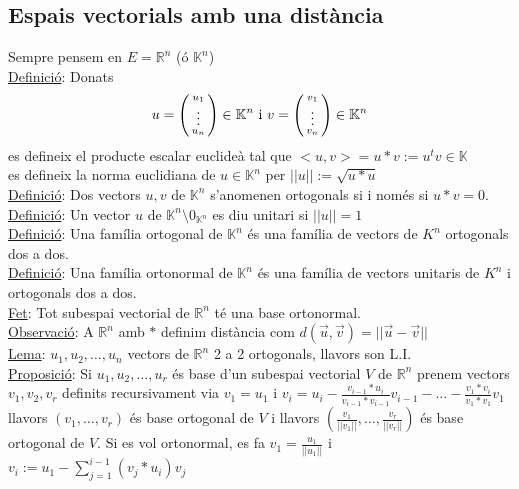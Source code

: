 \documentclass[../main.tex]{subfiles}
\begin{document}
    \subsection{Espais vectorials amb una distància}
    Sempre pensem en $E = \mathbb{R}^n$ (ó $\mathbb{K}^n$)\\
    \underline{Definició}: Donats 
    \begin{displaymath}
        u=\begin{psmallmatrix} u_1 \\ \vdots \\ u_n \end{psmallmatrix} \in \mathbb{K}^n \text{ i }v=\begin{psmallmatrix} v_1 \\ \vdots \\ v_n \end{psmallmatrix} \in \mathbb{K}^n
    \end{displaymath}
    es defineix el producte escalar euclideà tal que $<u, v> = u * v := u^tv \in \mathbb{K}$\\
    es defineix la norma euclidiana de $u \in \mathbb{K}^n$ per $||u|| := \sqrt{u*u}$\\
    \underline{Definició}: Dos vectors $u, v$ de $\mathbb{K}^n$ s'anomenen ortogonals si i només si $u*v=0$.\\
    \underline{Definició}: Un vector $u$ de $\mathbb{K}^n \setminus 0_{\mathbb{K}^n}$ es diu unitari si $||u|| = 1$\\
    \underline{Definició}: Una família ortogonal de $\mathbb{K}^n$ és una família de vectors de $K^n$ ortogonals dos a dos.\\
    \underline{Definició}: Una família ortonormal de $\mathbb{K}^n$ és una família de vectors unitaris de $K^n$ i ortogonals dos a dos.\\
    \underline{Fet}: Tot subespai vectorial de $\mathbb{R}^n$ té una base ortonormal.\\
    \underline{Observació}: A $\mathbb{R}^n$ amb $*$ definim distància com $d(\vec{u}, \vec{v}) = ||\vec{u}-\vec{v}||$\\
    \underline{Lema}: $u_1, u_2, \dots, u_n$ vectors de $\mathbb{R}^n$ 2 a 2 ortogonals, llavors son L.I.\\
    \underline{Proposició}: Si $u_1, u_2, \dots, u_r$ és base d'un subespai vectorial $V$ de $\mathbb{R}^n$ prenem vectors $v_1, v_2, v_r$ definits recursivament via $v_1 = u_1$ i $v_i = u_i - \frac{v_{i-1}*u_i}{v_{i-1}*v_{i-1}}v_{i-1} - \dots - \frac{v_1*v_i}{v_1*v_1}v_1$ llavors $(v_1, \dots, v_r)$ és base ortogonal de $V$ i llavors $(\frac{v_1}{||v_1||}, \dots, \frac{v_r}{||v_r||})$ és base ortogonal de $V$. Si es vol ortonormal, es fa $v_1 = \frac{u_1}{||u_1||}$ i $v_i := u_1 - \sum\limits_{j=1}^{i-1}(v_j*u_i)v_j$
\end{document}
